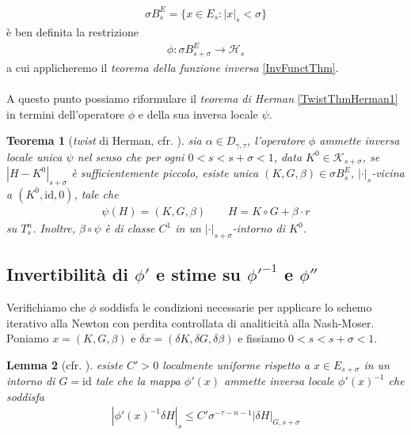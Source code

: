 \documentclass[twoside, 11pt]{amsbook}
\newcommand{\0}{{(0)}}
\newcommand{\3}{{(3)}}
\theoremstyle{colonplain}
\newtheorem{thm}{Teorema}[chapter]
\newtheorem{lemma}[thm]{Lemma}
\theoremstyle{colondefinition}
\theoremstyle{colonremark}
\numberwithin{equation}{chapter}
\begin{document}
\begin{align}
    \sigma B^E_s = \{x \in E_s : |x|_s < \sigma\}
\end{align}
è ben definita la restrizione
\begin{align}
    \phi : \sigma B^E_{s + \sigma} \longrightarrow \mathcal{H}_s
\end{align}
a cui applicheremo il \textit{teorema della funzione inversa} \ref{InvFunctThm}. \\ \\
A questo punto possiamo riformulare il \textit{teorema di Herman} \ref{TwistThmHerman1} in termini dell'operatore $\phi$ e della sua inversa locale $\psi$.
\begin{thm}[\textit{twist} di Herman, cfr. \cite{Fejoz02}]\label{TwistThmHerman2} sia $\alpha \in D_{\gamma, \tau}$, l'operatore $\phi$ ammette inversa locale unica $\psi$ nel senso che per ogni $0 < s < s + \sigma < 1$, data $K^0 \in \mathcal{K}_{s + \sigma}$, se $|H - K^0|_{s + \sigma}$ è sufficientemente piccolo, esiste unica $(K, G, \beta) \in \sigma B^E_s$, $|\cdot|_s$-vicina a $(K^0, \mathrm{id}, 0)$, tale che
\begin{align}
    \psi(H) = (K, G, \beta) \qquad H = K \circ G + \beta \cdot r
\end{align}
su $T^n_s$. Inoltre, $\beta \circ \psi$ è di classe $C^1$ in un $|\cdot|_{s + \sigma}$-intorno di $K^0$.
\end{thm}
\subsection{Invertibilità di $\phi'$ e stime su $\phi'^{-1}$ e $\phi''$}
Verifichiamo che $\phi$ soddisfa le condizioni necessarie per applicare lo schemo iterativo alla Newton con perdita controllata di analiticità alla Nash-Moser. \\
Poniamo $x = (K, G, \beta)$ e $\delta x = (\delta K, \delta G, \delta \beta)$ e fissiamo $0 < s < s + \sigma < 1$.
\begin{lemma}[cfr. \cite{Fejoz02}] esiste $C' > 0$ localmente uniforme rispetto a $x \in E_{s + \sigma}$ in un intorno di $G = \mathrm{id}$ tale che la mappa $\phi'(x)$ ammette inversa locale $\phi'(x)^{-1}$ che soddisfa
\begin{align}
    |\phi'(x)^{-1}\delta H|_{s} \leq C'\sigma^{-\tau - n - 1}|\delta H|_{G, s + \sigma}
\end{align}
\end{lemma}
\end{document}
